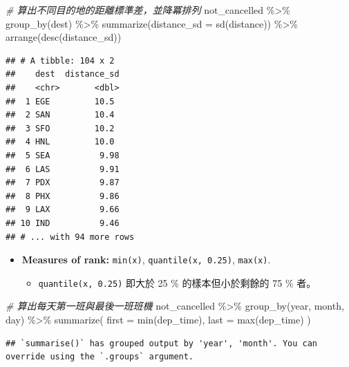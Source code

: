 \documentclass[
]{book}
\newenvironment{Shaded}{\begin{snugshade}}{\end{snugshade}}
\newcommand{\AttributeTok}[1]{\textcolor[rgb]{0.77,0.63,0.00}{#1}}
\newcommand{\CommentTok}[1]{\textcolor[rgb]{0.56,0.35,0.01}{\textit{#1}}}
\newcommand{\FunctionTok}[1]{\textcolor[rgb]{0.00,0.00,0.00}{#1}}
\newcommand{\NormalTok}[1]{#1}
\newcommand{\SpecialCharTok}[1]{\textcolor[rgb]{0.00,0.00,0.00}{#1}}
\providecommand{\tightlist}{%
  \setlength{\itemsep}{0pt}\setlength{\parskip}{0pt}}
\theoremstyle{definition}
\theoremstyle{remark}
\begin{document}
\begin{Shaded}
\begin{Highlighting}[]
\CommentTok{\# 算出不同目的地的距離標準差，並降冪排列}
\NormalTok{not\_cancelled }\SpecialCharTok{\%\textgreater{}\%}
  \FunctionTok{group\_by}\NormalTok{(dest) }\SpecialCharTok{\%\textgreater{}\%}
  \FunctionTok{summarize}\NormalTok{(}\AttributeTok{distance\_sd =} \FunctionTok{sd}\NormalTok{(distance)) }\SpecialCharTok{\%\textgreater{}\%}
  \FunctionTok{arrange}\NormalTok{(}\FunctionTok{desc}\NormalTok{(distance\_sd))}
\end{Highlighting}
\end{Shaded}

\begin{verbatim}
## # A tibble: 104 x 2
##    dest  distance_sd
##    <chr>       <dbl>
##  1 EGE         10.5 
##  2 SAN         10.4 
##  3 SFO         10.2 
##  4 HNL         10.0 
##  5 SEA          9.98
##  6 LAS          9.91
##  7 PDX          9.87
##  8 PHX          9.86
##  9 LAX          9.66
## 10 IND          9.46
## # ... with 94 more rows
\end{verbatim}

\begin{itemize}
\item
  \textbf{Measures of rank:} \texttt{min(x)}, \texttt{quantile(x,\ 0.25)}, \texttt{max(x)}.

  \begin{itemize}
  \tightlist
  \item
    \texttt{quantile(x,\ 0.25)} 即大於 25 \% 的樣本但小於剩餘的 75 \% 者。
  \end{itemize}
\end{itemize}

\begin{Shaded}
\begin{Highlighting}[]
\CommentTok{\# 算出每天第一班與最後一班班機}
\NormalTok{not\_cancelled }\SpecialCharTok{\%\textgreater{}\%}
  \FunctionTok{group\_by}\NormalTok{(year, month, day) }\SpecialCharTok{\%\textgreater{}\%}
  \FunctionTok{summarize}\NormalTok{(}
    \AttributeTok{first =} \FunctionTok{min}\NormalTok{(dep\_time),}
    \AttributeTok{last =} \FunctionTok{max}\NormalTok{(dep\_time)}
\NormalTok{  )}
\end{Highlighting}
\end{Shaded}

\begin{verbatim}
## `summarise()` has grouped output by 'year', 'month'. You can override using the `.groups` argument.
\end{verbatim}
\end{document}
